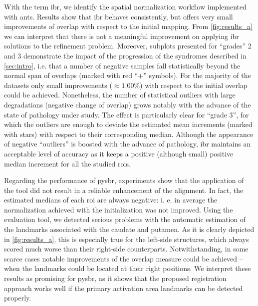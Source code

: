 \documentclass{frontiers}
\begin{document}
With the term \gls*{ibr}, we identify the spatial normalization
  workflow implemented with \gls*{ants}.
Results show that \gls*{ibr} behaves consistently,
  but offers very small improvements of overlap with respect to the
  initial mapping.
From \autoref{fig:results_a} we can interpret that there is not 
  a meaningful improvement on applying \gls*{ibr} solutions to 
  the refinement problem.
Moreover, subplots presented for ``grades'' 2 and 3 demonstrate the
  impact of the progression of the syndromes described in 
  \autoref{sec:intro}, i.e. that a number of negative samples fall 
   statistically beyond the normal span of overlaps (marked with red ``+'' symbols).
For the majority of the datasets only small improvements ($\approx1.00\%$)
  with respect to the initial overlap could be achieved.
Nonetheless, the number of statistical outliers with large degradations
  (negative change of overlap) grows notably with the advance of the state of
  pathology under study.
The effect is particularly clear for ``grade 3'', for which the outliers are enough
  to deviate the estimated mean increments (marked with stars) with respect to their
  corresponding median.
Although the appearance of negative ``outliers'' is boosted with the advance
  of pathology, \gls*{ibr} maintains an acceptable level of accuracy as it keeps
  a positive (although small) positive median increment for all the studied \glspl*{roi}.
  
Regarding the performance of \gls*{pysbr}, experiments show that the application of the tool
  did not result in a reliable enhancement of the alignment.
In fact, the estimated medians of each \gls*{roi} are always negative: i. e. in average
  the normalization achieved with the initialization was not improved.
Using the evaluation tool, we detected serious problems with the automatic 
  estimation of the landmarks associated with the caudate and putamen.
As it is clearly depicted in \autoref{fig:results_a}, this is especially true for the left-side
  structures, which always scored much worse than their right-side counterparts.
Notwithstanding, in some scarce cases notable improvements of the overlap measure could be achieved
  --  when the landmarks could be located at their right positions.
We interpret these results as promising for \gls*{pysbr}, as it shows that the proposed registration 
  approach works well if the primary activation area landmarks can be detected properly.
\end{document}
